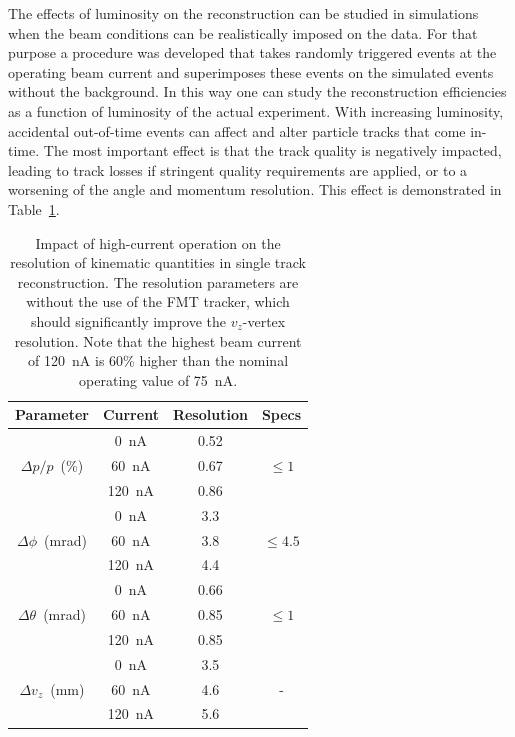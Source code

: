 \documentclass[final,3p,twocolumn]{elsarticle}
\begin{document}
The effects of luminosity on the reconstruction can be studied in simulations when the beam conditions can be realistically
imposed on the data. For that purpose a procedure was developed that takes randomly triggered events at the operating
beam current and superimposes these events on the simulated events without the background. In this way one can study
the reconstruction efficiencies as a function of luminosity of the actual experiment. With increasing luminosity, accidental
out-of-time events can affect and alter particle tracks that come in-time. The most important effect is that the track
quality is negatively impacted, leading to track losses if stringent quality requirements are applied, or to a worsening of
the angle and momentum resolution. This effect is demonstrated in Table~\ref{resolution}.   

\begin{table}[htbp!]
\begin{center}
\begin{tabular}{c|c|c|c} \hline
  Parameter & Current & Resolution &Specs \\ \hline
  & 0~nA  & 0.52 & \\
$\Delta{p}/p$~(\%) &60~nA &  0.67& $\le 1$\\
& 120~nA &  0.86 &  \\ \hline 
&0~nA &  3.3 &  \\
$\Delta \phi$~(mrad)& 60~nA &  3.8 &  $\le 4.5$\\
&120~nA  & 4.4 &  \\ \hline
&0~nA &  0.66 &  \\
$\Delta \theta$~(mrad)& 60~nA &  0.85 &  $\le 1$\\
&120~nA  & 0.85 &  \\ \hline
& 0~nA & 3.5 &  \\
$\Delta{v_z}$~(mm) & 60~nA & 4.6 & -  \\
& 120~nA & 5.6 & \\ \hline
\end{tabular}
\caption{Impact of high-current operation on the resolution of kinematic quantities in single track reconstruction. The
  resolution parameters are without the use of the FMT tracker, which should significantly improve the $v_z$-vertex
  resolution. Note that the highest beam current of 120~nA is 60\% higher than the nominal operating value of 75~nA.}     
\label{resolution}
\end{center}
\end{table}
\end{document}
